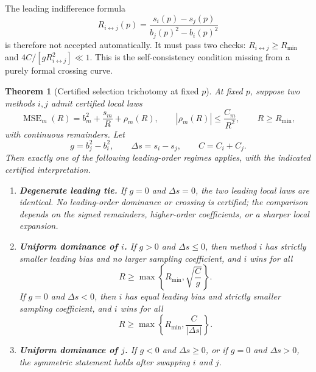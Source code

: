 \documentclass[11pt]{article}
\newtheorem{theorem}{Theorem}
\newcommand{\MSE}{\operatorname{MSE}}
\newcommand{\1}{\mathbf{1}}
\newcommand{\abs}[1]{\left\lvert #1 \right\rvert}
\begin{document}
The leading indifference formula
\begin{equation}
    R_{i\leftrightarrow j}(p)=\frac{s_i(p)-s_j(p)}{b_j(p)^2-b_i(p)^2}
    \label{eq:leading_crossing_formula}
\end{equation}
is therefore not accepted automatically.  It must pass two checks: \(R_{i\leftrightarrow j}\geq R_{\min}\) and \(4C/[gR_{i\leftrightarrow j}^2]\ll1\).  This is the self-consistency condition missing from a purely formal crossing curve.


\begin{theorem}[Certified selection trichotomy at fixed \(p\)]
\label{thm:selection_trichotomy_v10}
At fixed \(p\), suppose two methods \(i,j\) admit certified local laws
\begin{equation}
    \MSE_m(R)=b_m^2+\frac{s_m}{R}+\rho_m(R),
    \qquad
    \abs{\rho_m(R)}\le \frac{C_m}{R^2},
    \qquad R\ge R_{\min},
\end{equation}
with continuous remainders.  Let
\begin{equation}
    g=b_j^2-b_i^2,
    \qquad
    \Delta s=s_i-s_j,
    \qquad
    C=C_i+C_j.
\end{equation}
Then exactly one of the following leading-order regimes applies, with the indicated certified interpretation.
\begin{enumerate}[leftmargin=2.2em]
\item[\textnormal{(0)}] \textbf{Degenerate leading tie.}  If \(g=0\) and \(\Delta s=0\), the two leading local laws are identical.  No leading-order dominance or crossing is certified; the comparison depends on the signed remainders, higher-order coefficients, or a sharper local expansion.
\item[\textnormal{(I)}] \textbf{Uniform dominance of \(i\).}  If \(g>0\) and \(\Delta s\le0\), then method \(i\) has strictly smaller leading bias and no larger sampling coefficient, and \(i\) wins for all
\begin{equation}
    R\ge \max\left\{R_{\min},\sqrt{\frac{C}{g}}\right\}.
\end{equation}
If \(g=0\) and \(\Delta s<0\), then \(i\) has equal leading bias and strictly smaller sampling coefficient, and \(i\) wins for all
\begin{equation}
    R\ge \max\left\{R_{\min},\frac{C}{\abs{\Delta s}}\right\}.
\end{equation}
\item[\textnormal{(II)}] \textbf{Uniform dominance of \(j\).}  If \(g<0\) and \(\Delta s\ge0\), or if \(g=0\) and \(\Delta s>0\), the symmetric statement holds after swapping \(i\) and \(j\).

\end{enumerate}
\end{theorem}
\end{document}
